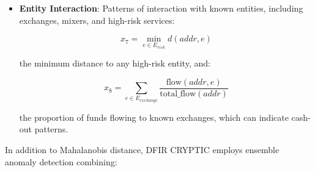 \documentclass[conference]{IEEEtran}
\begin{document}
\begin{itemize}
    the betweenness centrality, measuring how often the address appears on shortest paths between other addresses.
    
    \item \textbf{Entity Interaction}: Patterns of interaction with known entities, including exchanges, mixers, and high-risk services:
    
    \begin{equation}
    x_7 = \min_{e \in E_{risk}} d(addr, e)
    \end{equation}
    
    the minimum distance to any high-risk entity, and:
    
    \begin{equation}
    x_8 = \sum_{e \in E_{exchange}} \frac{\text{flow}(addr, e)}{\text{total\_flow}(addr)}
    \end{equation}
    
    the proportion of funds flowing to known exchanges, which can indicate cash-out patterns.
\end{itemize}

In addition to Mahalanobis distance, DFIR CRYPTIC employs ensemble anomaly detection combining:
\end{document}
